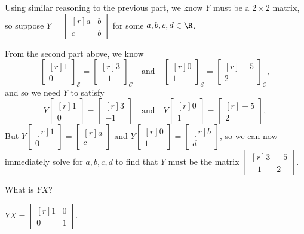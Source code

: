 \documentclass{problemset}
\newcommand{\mat}[1]{\begin{bmatrix*}[r]#1\end{bmatrix*}}
\begin{document}
\begin{parts}
\begin{solution}
				Using similar reasoning to the previous part, we know $Y$ must be
				a $2\times2$ matrix, so suppose $Y=\mat{a&b\\c&b}$ for some
				$a,b,c,d\in\R$.

				From the second part above, we know
				\[
					\mat{1\\0}_{\mathcal E} = \mat{3\\-1}_{\mathcal C}
					\quad \text{and} \quad
					\mat{0\\1}_{\mathcal E} = \mat{-5\\2}_{\mathcal C},
				\]
				and so we need $Y$ to satisfy
				\[
					Y\mat{1\\0}=\mat{3\\-1}
					\quad \text{and} \quad
					Y\mat{0\\1}=\mat{-5\\2},
				\]
				But $Y\mat{1\\0}=\mat{a\\c}$ and $Y\mat{0\\1}=\mat{b\\d}$, so we
				can now immediately solve for $a,b,c,d$ to find that $Y$ must be
				the matrix $\mat{3&-5\\-1&2}$.
			\end{solution}
		\item What is $YX$?
			\begin{solution}
				$YX = \mat{1&0\\0&1}$.
			\end{solution}
	\end{parts}
\end{document}
